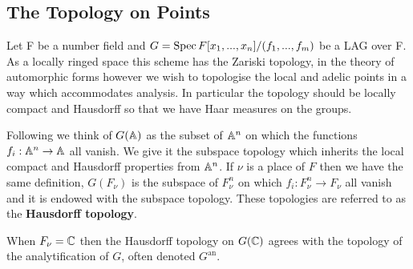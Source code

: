     \subsection{The Topology on Points}
	Let F be a number field and \(G = \operatorname{Spec} F[x_1, ..., x_n]/(f_1, ..., f_m)\) be a LAG over F. As a locally ringed space this scheme has the Zariski topology, in the theory of automorphic forms however we wish to topologise the local and adelic points in a way which accommodates analysis. In particular the topology should be locally compact and Hausdorff so that we have Haar measures on the groups. 
	
	Following \cite{conradWeilGrothendieckApproaches2012} we think of \(G(\A)\) as the subset of \(\A^n\) on which the functions \(f_i: \A^n \to \A\) all vanish. We give it the subspace topology which inherits the local compact and Hausdorff properties from \(\A^n\). If \(\nu\) is a place of \(F\) then we have the same definition, \(G(F_\nu)\) is the subspace of \(F_\nu^n\) on which \(f_i:F_\nu^n \to F_\nu\) all vanish and it is endowed with the subspace topology.
	These topologies are referred to as the \textbf{Hausdorff topology}.
	
	\begin{remark}
		When \(F_\nu = \C\) then the Hausdorff topology on \(G(\C)\) agrees with the topology of the analytification of \(G\), often denoted \(G^{\mathrm{an}}\).
	\end{remark}

